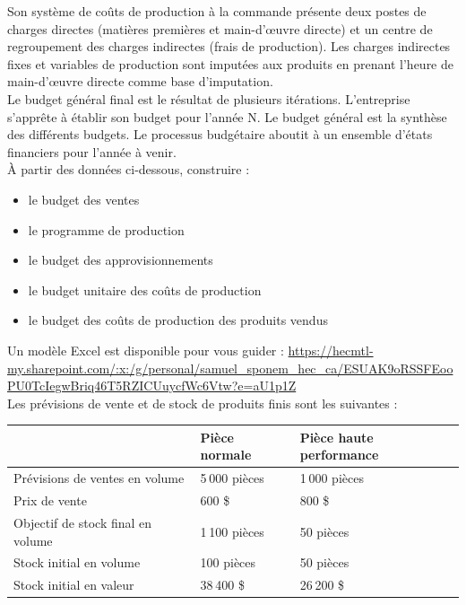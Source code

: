 \documentclass{tufte-handout}
\begin{document}
\begin{enumerate}
Son système de coûts de production à la commande présente deux postes de charges directes (matières premières et main-d’œuvre directe) et un centre de regroupement des charges indirectes (frais de production). Les charges indirectes fixes et variables de production sont imputées aux produits en prenant l’heure de main-d’œuvre directe comme base d’imputation.\\

Le budget général final est le résultat de plusieurs itérations. L’entreprise s’apprête à établir son budget pour l’année N. Le budget général est la synthèse des différents budgets. Le processus budgétaire aboutit à un ensemble d’états financiers pour l’année à venir.\\

À partir des données ci-dessous, construire :\\
\begin{itemize}
\item le budget des ventes\\
\item le programme de production\\
\item le budget des approvisionnements\\
\item le budget unitaire des coûts de production\\
\item le budget des coûts de production des produits vendus\\
\end{itemize}

Un modèle Excel est disponible pour vous guider : \url{https://hecmtl-my.sharepoint.com/:x:/g/personal/samuel\_sponem\_hec\_ca/ESUAK9oRSSFEooPU0TcIegwBriq46T5RZICUuycfWc6Vtw?e=aU1p1Z}\\

Les prévisions de vente et de stock de produits finis sont les suivantes :\\
\begin{center}
\begin{tabular}{lll}
 & Pièce normale & Pièce haute performance\\
\hline
Prévisions de ventes en volume & 5 000 pièces & 1 000 pièces\\
Prix de vente & 600 \$ & 800 \$\\
Objectif de stock final en volume & 1 100 pièces & 50 pièces\\
Stock initial en volume & 100 pièces & 50 pièces\\
Stock initial en valeur & 38 400 \$ & 26 200 \$\\
\end{tabular}
\end{center}


\end{enumerate}
\end{document}
